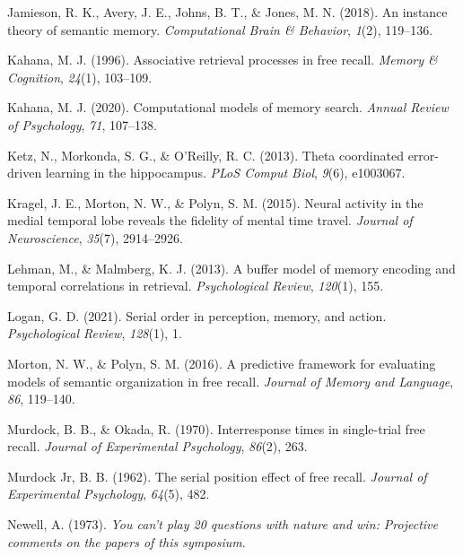 \documentclass[
  letterpaper,
]{article}
\newlength{\cslhangindent}
\newlength{\cslentryspacingunit} %
\newenvironment{CSLReferences}[2] %
 {%
  \setlength{\parindent}{0pt}
  \ifodd #1
  \let\oldpar\par
  \def\par{\hangindent=\cslhangindent\oldpar}
  \fi
  \setlength{\parskip}{#2\cslentryspacingunit}
 }%
 {}
\begin{document}
\begin{CSLReferences}{1}{0}
\leavevmode{}%
Jamieson, R. K., Avery, J. E., Johns, B. T., \& Jones, M. N. (2018). An
instance theory of semantic memory. \emph{Computational Brain \&
Behavior}, \emph{1}(2), 119--136.

\leavevmode{}%
Kahana, M. J. (1996). Associative retrieval processes in free recall.
\emph{Memory \& Cognition}, \emph{24}(1), 103--109.

\leavevmode{}%
Kahana, M. J. (2020). Computational models of memory search.
\emph{Annual Review of Psychology}, \emph{71}, 107--138.

\leavevmode{}%
Ketz, N., Morkonda, S. G., \& O'Reilly, R. C. (2013). Theta coordinated
error-driven learning in the hippocampus. \emph{PLoS Comput Biol},
\emph{9}(6), e1003067.

\leavevmode{}%
Kragel, J. E., Morton, N. W., \& Polyn, S. M. (2015). Neural activity in
the medial temporal lobe reveals the fidelity of mental time travel.
\emph{Journal of Neuroscience}, \emph{35}(7), 2914--2926.

\leavevmode{}%
Lehman, M., \& Malmberg, K. J. (2013). A buffer model of memory encoding
and temporal correlations in retrieval. \emph{Psychological Review},
\emph{120}(1), 155.

\leavevmode{}%
Logan, G. D. (2021). Serial order in perception, memory, and action.
\emph{Psychological Review}, \emph{128}(1), 1.

\leavevmode{}%
Morton, N. W., \& Polyn, S. M. (2016). A predictive framework for
evaluating models of semantic organization in free recall. \emph{Journal
of Memory and Language}, \emph{86}, 119--140.

\leavevmode{}%
Murdock, B. B., \& Okada, R. (1970). Interresponse times in single-trial
free recall. \emph{Journal of Experimental Psychology}, \emph{86}(2),
263.

\leavevmode{}%
Murdock Jr, B. B. (1962). The serial position effect of free recall.
\emph{Journal of Experimental Psychology}, \emph{64}(5), 482.

\leavevmode{}%
Newell, A. (1973). \emph{You can't play 20 questions with nature and
win: Projective comments on the papers of this symposium}.


\end{CSLReferences}
\end{document}
